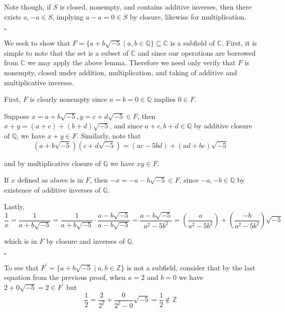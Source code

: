 \documentclass[letterpaper,11pt]{article}
\theoremstyle{definition}
\begin{document}
Note though, if $S$ is closed, nonempty, and contains additive inverses, then there exists $a, -a \in S$, implying $a - a = 0 \in S$ by closure, likewise for multiplication.

\begin{flushright}
	$\square$
\end{flushright}



\hrulefill 
\vspace*{2mm}


We seek to show that $F = \{a + b\sqrt{-5} \mid a, b \in \mathbb{Q}\} \subseteq \mathbb{C}$ is a subfield of $\mathbb{C}$. First, it is simple to note that the set is a subset of $\mathbb{C}$ and since our operations are borrowed from $\mathbb{C}$ we may apply the above lemma. Therefore we need only verify that $F$ is nonempty, closed under addition, multiplication, and taking of additive and multiplicative inverses.

First, $F$ is clearly nonempty since $a = b = 0 \in \mathbb{Q}$ implies $0 \in F$.

Suppose $x = a+b\sqrt{-5}, y = c + d\sqrt{-5} \in F$, then $x + y = (a + c) + (b + d)\sqrt{-5}$, and since $a + c, b + d \in \mathbb{Q}$ by additive closure of $\mathbb{Q}$, we have $x + y \in F$. Similarly, note that $$(a + b\sqrt{-5}) (c + d\sqrt{-5}) = (ac -5bd) + (ad + bc)\sqrt{-5}$$

and by multiplicative closure of $\mathbb{Q}$ we have $xy \in F$.

If $x$ defined as above is in $F$, then $-x = -a - b\sqrt{-5} \in F$, since $-a, -b \in \mathbb{Q}$ by existence of additive inverses of $\mathbb{Q}$. 

Lastly, $$\frac{1}{x} = \frac{1}{a + b\sqrt{-5}} = \frac{1}{a + b\sqrt{-5}}\cdot\frac{a-b\sqrt{-5}}{a - b\sqrt{-5}} = \frac{a-b\sqrt{-5}}{a^2 -5b^2} = \left(\frac{a}{a^2-5b^2}\right) + \left(\frac{-b}{a^2-5b^2}\right)\sqrt{-5}$$

which is in $F$ by closure and inverses of $\mathbb{Q}$. 

\begin{flushright}
	$\square$
\end{flushright}

\hrulefill 
\vspace*{2mm}

To see that $F^\prime = \{a + b\sqrt{-5} \mid a, b \in \mathbb{Z}\}$ is not a subfield, consider that by the last equation from the previous proof, when $a = 2$ and $b = 0$ we have $2 + 0\sqrt{-5} = 2 \in F^\prime$ but $$\frac{1}{2} = \frac{2}{2^2} + \frac{0}{2^2 - 0}\sqrt{-5} = \frac{1}{2} \notin \mathbb{Z}$$
\end{document}
